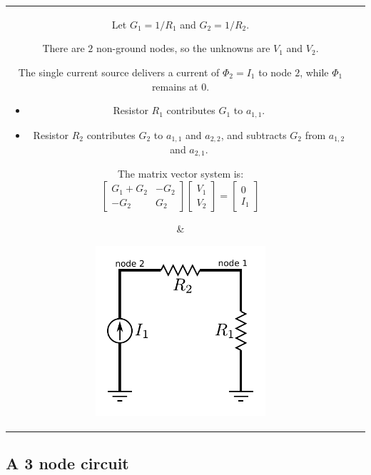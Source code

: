 \documentclass{article}
\begin{document}
\begin{tabular}{cc}
\parbox{0.5\textwidth}{
Let \(G_1 = 1/R_1\) and \(G_2 = 1/R_2\). 

There are \(2\) non-ground nodes, so the unknowns are \(V_1\) and \(V_2\). 

The single current source delivers a current of \(\Phi_2 = I_1\) to node \(2\), while \(\Phi_1\) remains at \(0\). 

\begin{itemize}
\item Resistor \(R_1\) contributes \(G_1\) to \(a_{1,1}\). 
\item Resistor \(R_2\) contributes \(G_2\) to \(a_{1,1}\) and \(a_{2,2}\), and subtracts \(G_2\) from \(a_{1,2}\) and \(a_{2,1}\).
\end{itemize}

The matrix vector system is: 
\[\begin{bmatrix} G_1 + G_2 & -G_2 \\ -G_2 & G_2 \end{bmatrix}
\begin{bmatrix} V_1 \\ V_2 \end{bmatrix} = 
\begin{bmatrix} 0 \\ I_1 \end{bmatrix}\]
} & \parbox{0.5\textwidth}{
\includegraphics[width = 0.5\textwidth]{series_circuit_1}
}
\end{tabular}



\subsection{A 3 node circuit}
\end{document}
